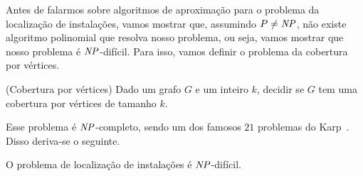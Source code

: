 Antes de falarmos sobre algoritmos de aproximação para o problema da localização de instalações, vamos mostrar que, assumindo $P\neq\mathit{NP}$, não existe algoritmo polinomial que resolva nosso problema, ou seja, vamos mostrar que nosso problema é $\mathit{NP}$-difícil. Para isso, vamos definir o problema da cobertura por vértices.



\begin{problem}(Cobertura por vértices)
    Dado um grafo $G$ e um inteiro $k$, decidir se $G$ tem uma cobertura por vértices de tamanho $k$.
\end{problem}
Esse problema é $\mathit{NP}$-completo, sendo um dos famosos $21$ problemas do Karp~\cite{Karp1972}. Disso deriva-se o seguinte.

\begin{theorem}
    O problema de localização de instalações é $\mathit{NP}$-difícil.
\end{theorem}


